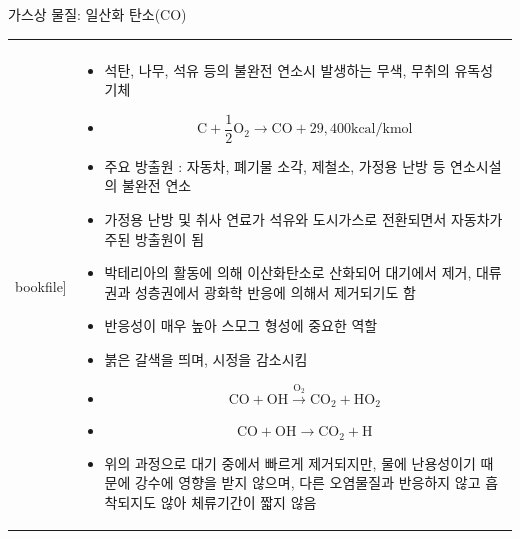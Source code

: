 \begin{frame}[t]{가스상 물질: 일산화 탄소(CO)}
	\begin{tabular}{ll}
		\begin{minipage}[t]{0.3\textwidth}\scriptsize
			\begin{figure}[t]
				\texttt{[image: \\bookfile]}
			\end{figure}
		\end{minipage}	
		&
		\begin{minipage}[t]{0.65\textwidth} \scriptsize	
			\begin{itemize}
				\item 석탄, 나무, 석유 등의 불완전 연소시 발생하는 무색, 무취의 유독성 기체
				\item $$
						\mathrm{C}+\frac{1}{2} \mathrm{O}_{2} \longrightarrow \mathrm{CO}+29,400 \mathrm{kcal} / \mathrm{kmol}
						$$
				\item 주요 방출원 : 자동차, 폐기물 소각, 제철소, 가정용 난방 등 연소시설의 불완전 연소
				\item 가정용 난방 및 취사 연료가 석유와 도시가스로 전환되면서 자동차가 주된 방출원이 됨
				\item 박테리아의 활동에 의해 이산화탄소로 산화되어 대기에서 제거, 대류권과 성층권에서 광화학 반응에 의해서 제거되기도 함
				\item 반응성이 매우 높아 스모그 형성에 중요한 역할
				\item 붉은 갈색을 띄며, 시정을 감소시킴
				\item $$
						\mathrm{CO}+\mathrm{OH} \stackrel{\mathrm{O}_{2}}{\longrightarrow} \mathrm{CO}_{2}+\mathrm{HO}_{2} 
						$$
				\item $$
						\mathrm{CO}+\mathrm{OH} \longrightarrow \mathrm{CO}_{2}+\mathrm{H}
						$$
				
				\item 위의 과정으로 대기 중에서 빠르게 제거되지만, 물에 난용성이기 때문에 강수에 영향을 받지 않으며, 다른 오염물질과 반응하지 않고 흡착되지도 않아 체류기간이 짧지 않음
				
					
			\end{itemize}

		\end{minipage}
	\end{tabular}
\end{frame}



